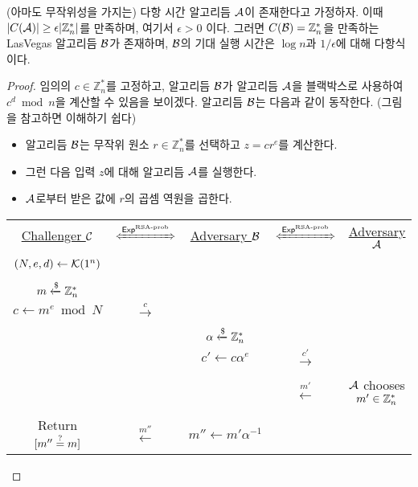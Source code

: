 \begin{theorem}
    (아마도 무작위성을 가지는) 다항 시간 알고리듬 $\mathcal{A}$이 존재한다고 가정하자.
    이때 $|C(\mathcal{A})| \geq \epsilon |\mathbb{Z}^*_n|$를 만족하며, 여기서 $\epsilon >
    0$ 이다. 그러면 $C(\mathcal{B}) = \mathbb{Z}^*_n$을 만족하는 LasVegas 알고리듬
    $\mathcal{B}$가 존재하며, $\mathcal{B}$의 기대 실행 시간은 $\log n$과 $1/\epsilon$에 대해
    다항식이다.
\end{theorem}

\begin{proof}
    임의의 $c \in \mathbb{Z}_n^*$를 고정하고, 알고리듬 $\mathcal{B}$가 알고리듬 $\mathcal{A}$을
    블랙박스로 사용하여 $c^d \bmod n$을 계산할 수 있음을 보이겠다. 알고리듬
    $\mathcal{B}$는 다음과 같이 동작한다. (그림을 참고하면 이해하기 쉽다)
    \begin{itemize}
        \item 알고리듬 $\mathcal{B}$는 무작위 원소 $r \in \mathbb{Z}_n^*$를 선택하고 $z = cr^e$를 계산한다. 
        \item 그런 다음 입력 $z$에 대해 알고리듬 $\mathcal{A}$를 실행한다.
        \item $\mathcal{A}$로부터 받은 값에 $r$의 곱셈 역원을 곱한다.
    \end{itemize}

    \begin{tcolorbox}[colback=white]
        \centering
        \begin{tabularx}{\linewidth}{CcCcC}
            \underline{Challenger $\mathcal{C}$} & $\xLeftrightarrow{\EXP^{\textnormal{RSA-prob}}}$ & \underline{Adversary $\mathcal{B}$} & $\xLeftrightarrow{\EXP^{\textnormal{RSA-prob}}}$ & \underline{Adversary $\mathcal{A}$} \\
            \\
            $(N, e, d) \gets \mathcal{K}(1^{n})$ & & & & \\
            \\
            $m \xleftarrow{\$} \mathbb{Z}^*_n$ & & & & \\
            $c \gets m^e \bmod N$ & $\xrightarrow{c}$ & & & \\
            \\
            & & $\alpha \xleftarrow{\$} \mathbb{Z}^*_n$ & & \\
            & & $c' \gets c \alpha^e$ & $\xrightarrow{c'}$ & \\
            \\
            & & & $\xleftarrow{m'}$ & $\mathcal{A}$ chooses $m' \in \mathbb{Z}^*_n$ \\
            \\
            Return $[m'' \overset{?}{=} m]$ & $\xleftarrow{m''}$ & $m'' \gets m' \alpha^{-1}$ & & \\
      \end{tabularx}
    \end{tcolorbox}


\end{proof}

